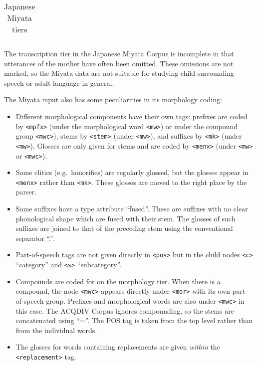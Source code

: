 \documentclass[a4paper, 11pt]{book}
\begin{document}
\begin{table}[ht!]
\begin{tabular}{lll}
		\bottomrule
	\end{tabular}
	\caption{Japanese Miyata tiers}
	\label{tab:Japanese Miyata tiers}
\end{table}

The transcription tier in the Japanese Miyata Corpus is incomplete in that utterances of the mother have often been omitted. These omissions are not marked, so the Miyata data are not suitable for studying child-surrounding speech or adult language in general. 

The Miyata input also has some peculiarities in its morphology coding: 

\begin{itemize}
	\item Different morphological components have their own tags: prefixes are coded by \texttt{<mpfx>} (under the morphological word \texttt{<mw>}) or
		under the compound group \texttt{<mwc>}), stems by \texttt{<stem>} (under \texttt{<mw>}), and suffixes by \texttt{<mk>} (under \texttt{<mw>}). 
		Glosses are only given for stems and are coded by \texttt{<menx>} (under \texttt{<mw>} or \texttt{<mwc>}). 
	\item Some clitics (e.g.\ honorifics) are regularly glossed, but the glosses appear in \texttt{<menx>} rather than \texttt{<mk>}. These glosses
		are moved to the right place by the parser. 
	\item Some suffixes have a type attribute “fused”. These are suffixes with no clear phonological shape which are fused with their stem. 
		The glosses of such suffixes are joined to that of the preceding stem using the conventional separator “.”. 
	\item Part-of-speech tags are not given directly in \texttt{<pos>} but in the child nodes \texttt{<c>} “category” and \texttt{<s>} “subcategory”.
	\item Compounds are coded for on the morphology tier. When there is a compound, the node \texttt{<mwc>} appears directly under \texttt{<mor>}
		with its own part-of-speech group. Prefixes and morphological words are also under \texttt{<mwc>} in this case. 
		The ACQDIV Corpus ignores compounding, so the stems are concatenated using “=”. The POS tag is taken from the top level rather than from the 
		individual words. 
	\item The glosses for words containing replacements are given \emph{within} the \texttt{<replacement>} tag. 
\end{itemize}
\end{document}
